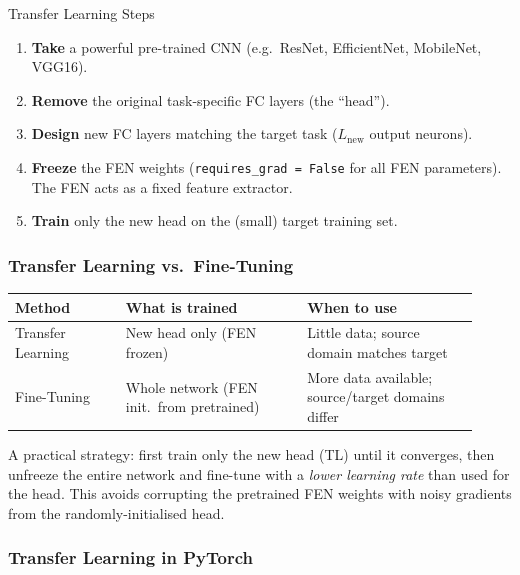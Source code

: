 \documentclass[11pt,a4paper]{article}
\begin{document}
\begin{algobox}{Transfer Learning Steps}
\begin{enumerate}
  \item \textbf{Take} a powerful pre-trained CNN (e.g.\ ResNet, EfficientNet, MobileNet, VGG16).
  \item \textbf{Remove} the original task-specific FC layers (the ``head'').
  \item \textbf{Design} new FC layers matching the target task ($L_{\text{new}}$ output neurons).
  \item \textbf{Freeze} the FEN weights (\texttt{requires\_grad = False} for all FEN parameters). The FEN acts as a fixed feature extractor.
  \item \textbf{Train} only the new head on the (small) target training set.
\end{enumerate}
\end{algobox}

\subsubsection{Transfer Learning vs.\ Fine-Tuning}

\begin{tcolorbox}[colback=LightBlue,colframe=AccentBlue,boxrule=0.8pt,arc=3pt]
\begin{tabular}{@{}p{0.22\linewidth}p{0.36\linewidth}p{0.34\linewidth}@{}}
\toprule
\textbf{Method} & \textbf{What is trained} & \textbf{When to use} \\
\midrule
Transfer Learning & New head only (FEN frozen) & Little data; source domain matches target \\
Fine-Tuning & Whole network (FEN init.\ from pretrained) & More data available; source/target domains differ \\
\bottomrule
\end{tabular}
\end{tcolorbox}

\begin{insightbox}
A practical strategy: first train only the new head (TL) until it converges, then unfreeze the entire network and fine-tune with a \emph{lower learning rate} than used for the head. This avoids corrupting the pretrained FEN weights with noisy gradients from the randomly-initialised head.
\end{insightbox}

\subsubsection{Transfer Learning in PyTorch}
\end{document}
